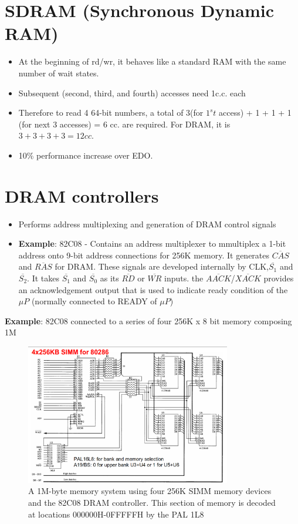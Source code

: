 \section{SDRAM (Synchronous Dynamic RAM)}
\begin{itemize}
  \item At the beginning of rd/wr, it behaves like a standard RAM with the same number of wait states.
  \item Subsequent (second, third, and fourth) accesses need 1c.c. each
  \item Therefore to read 4 64-bit numbers, a total of 3(for $1^st$ access) + 1 + 1 + 1 (for next 3 accesses) = 6 cc. are required. For DRAM, it is $3+3+3+3=12 cc.$
  \item 10\% performance increase over EDO.
\end{itemize}

\section{DRAM controllers}
\begin{itemize}
  \item Performs address multiplexing and generation of DRAM control signals
  \item \textbf{Example}: 82C08 - Contains an address multiplexer to mmultiplex a 1-bit address onto 9-bit address connections for 256K memory. It generates $\overline{CAS}$ and $\overline{RAS}$ for DRAM. These signals are developed internally by CLK,$\overline{S_1}$ and $\overline{S_2}$. It takes $\overline{S_1}$ and $\overline{S_0}$ as its $\overline{RD}$ or $\overline{WR}$ inputs. the $\overline{AACK}$/$\overline{XACK}$ provides an acknowledgement output that is used to indicate ready condition of the $\mu P$ (normally connected to READY of $\mu P$)
\end{itemize}
\textbf{Example}: 82C08 connected to a series of four 256K x 8 bit memory composing 1M
\begin{figure}[h!]
  \includegraphics[width = 0.8\textwidth]{./figures/82C08.png}
  \caption{A 1M-byte memory system using four 256K SIMM memory devices and the 82C08 DRAM controller. This section of memory is decoded at locations 000000H-0FFFFFH by the PAL 1L8}
  \label{}
\end{figure}


